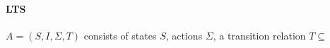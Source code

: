 \documentclass{article}
\begin{document}
\paragraph{LTS} $A = (S, I, \Sigma, T)$ consists of states $S$, actions $\Sigma$, a transition relation $T \subseteq$
\end{document}
